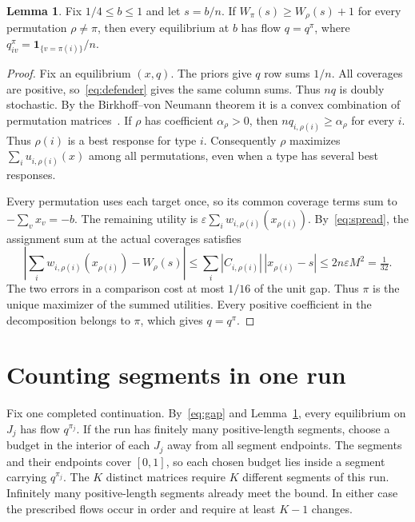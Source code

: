 \documentclass[11pt,letterpaper]{article}
\theoremstyle{definition}
\newtheorem{lemma}[theorem]{Lemma}
\newcommand{\ind}{\mathbf{1}}
\begin{document}
\begin{lemma}\label{lem:force}
Fix \(1/4\le b\le1\) and let \(s=b/n\). If \(W_\pi(s)\ge W_\rho(s)+1\)
for every permutation \(\rho\ne\pi\), then every equilibrium at \(b\) has
flow \(q=q^\pi\), where \(q^\pi_{iv}=\ind_{\{v=\pi(i)\}}/n\).
\end{lemma}

\begin{proof}
Fix an equilibrium \((x,q)\). The priors give \(q\) row sums \(1/n\).
All coverages are positive, so~\eqref{eq:defender} gives the same column
sums. Thus \(nq\) is doubly stochastic. By the Birkhoff--von Neumann theorem it is a
convex combination of permutation matrices~\cite{Birkhoff}. If \(\rho\) has
coefficient \(\alpha_\rho>0\), then \(nq_{i,\rho(i)}\ge\alpha_\rho\) for every \(i\).
Thus \(\rho(i)\) is a best response for type \(i\). Consequently
\(\rho\) maximizes \(\sum_i u_{i,\rho(i)}(x)\) among all permutations,
even when a type has several best responses.

Every permutation uses each target once, so its common coverage terms sum
to \(-\sum_v x_v=-b\). The remaining utility is
\(\varepsilon\sum_i w_{i,\rho(i)}(x_{\rho(i)})\).
By~\eqref{eq:spread}, the assignment sum at the actual coverages satisfies
\[
 \left|\sum_i w_{i,\rho(i)}(x_{\rho(i)})-W_\rho(s)\right|
 \le \sum_i |C_{i,\rho(i)}|\,|x_{\rho(i)}-s|
 \le 2n\varepsilon M^2=\tfrac1{32}.
\]
The two errors in a comparison cost at most \(1/16\) of the unit gap.
Thus \(\pi\) is the unique maximizer of the summed
utilities. Every positive coefficient in the decomposition belongs to
\(\pi\), which gives \(q=q^\pi\).
\end{proof}

\section{Counting segments in one run}\label{sec:count}

Fix one completed continuation. By~\eqref{eq:gap} and Lemma~\ref{lem:force},
every equilibrium on \(J_j\) has flow \(q^{\pi_j}\). If the run has finitely
many positive-length segments, choose a budget in the interior of each
\(J_j\) away from all segment endpoints. The segments and their endpoints
cover \([0,1]\), so each chosen budget lies inside a segment carrying
\(q^{\pi_j}\). The \(K\) distinct matrices require \(K\) different segments
of this run. Infinitely many positive-length segments already meet the
bound. In either case the prescribed flows occur in order and require
at least \(K-1\) changes.
\end{document}
